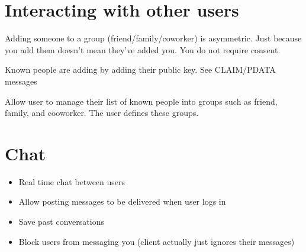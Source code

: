 \section{Interacting with other users}
    Adding someone to a group (friend/family/coworker) is asymmetric. Just
      because you add them doesn't mean they've added you. You do not require
      consent.
    
    Known people are adding by adding their public key. See CLAIM/PDATA messages
    
    Allow user to manage their list of known people into groups such as friend,
      family, and cooworker. The user defines these groups.

\section{Chat}
    \begin{itemize}
    \item Real time chat between users
    \item Allow posting messages to be delivered when user logs in
    \item Save past conversations
    \item Block users from messaging you (client actually just ignores their messages)
    \end{itemize}
